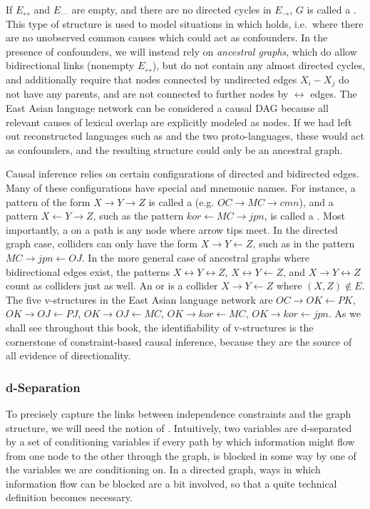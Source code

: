 If $E_\leftrightarrow$ and $E_\text{---}$ are empty, and there are no directed cycles in $E_\rightarrow$, $G$ is called a \textit{}. This type of structure is used to model situations in which  holds, i.e.\ where there are no unobserved common causes which could act as confounders. In the presence of confounders, we will instead rely on \textit{ancestral graphs}, which do allow bidirectional links (nonempty $E_\leftrightarrow$), but do not contain any almost directed cycles, and additionally require that nodes connected by undirected edges $X_i - X_j$ do not have any parents, and are not connected to further nodes by $\leftrightarrow$ edges. The East Asian language network can be considered a causal DAG because all relevant causes of lexical overlap are explicitly modeled as nodes. If we had left out reconstructed languages such as  and the two proto-languages, these would act as confounders, and the resulting structure could only be 
an ancestral graph.

Causal inference relies on certain configurations of directed and bidirected edges. Many of these configurations have special and mnemonic names. For instance, a pattern of the form $X \rightarrow Y \rightarrow Z$ is called a \textit{} (e.g. $OC \rightarrow MC \rightarrow cmn$), and a pattern $X \leftarrow Y \rightarrow Z$, such as the pattern $kor \leftarrow MC \rightarrow jpn$, is called a \textit{}.
Most importantly, a \textit{} on a path is any node where arrow tips meet. In the directed graph case, colliders can only have the form $X \rightarrow Y \leftarrow Z$, such as in the pattern $MC \rightarrow jpn \leftarrow OJ$. In the more general case of ancestral graphs where bidirectional edges exist, the patterns $X \leftrightarrow Y \leftrightarrow Z$, $X \leftrightarrow Y \leftarrow Z$, and $X \rightarrow Y \leftrightarrow Z$ count as colliders just as well. An  or \textit{} is a collider $X \rightarrow Y \leftarrow Z$ where $(X,Z) \notin E$. The five v-structures in the East Asian language network are $OC \rightarrow OK \leftarrow PK$, $OK \rightarrow OJ \leftarrow PJ$, $OK \rightarrow OJ \leftarrow MC$, $OK \rightarrow kor \leftarrow MC$, $OK \rightarrow kor \leftarrow jpn$. As we shall see throughout this book, the identifiability of v-structures is the cornerstone of constraint-based causal inference, because they are the source of all evidence 
of directionality.

\subsubsection{d-Separation}
To precisely capture the links between independence constraints and the graph structure, we will need the notion of \textit{}. Intuitively, two variables are d-separated by a set of conditioning variables if every path by which information might flow from one node to the other through the graph, is blocked in some way by one of the variables we are conditioning on. In a directed graph, ways in which information flow can be blocked are a bit involved, so that a quite technical definition becomes necessary.

